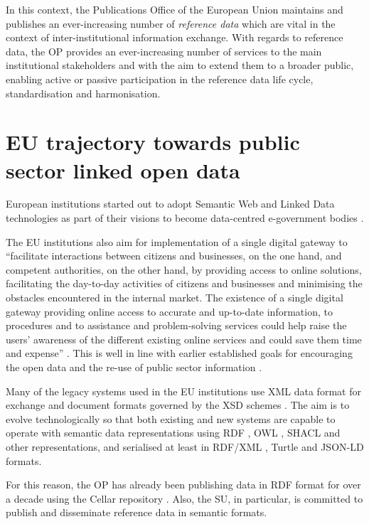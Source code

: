 	In this context, the Publications Office of the European Union maintains and publishes an ever-increasing number of \textit{reference data} which are vital in the context of inter-institutional information exchange. With regards to reference data, the OP provides an ever-increasing number of services to the main institutional stakeholders and with the aim to extend them to a broader public, enabling active or passive participation in the reference data life cycle, standardisation and harmonisation.

	\section{EU trajectory towards public sector linked open data}
	
	European institutions started out to adopt Semantic Web and Linked Data technologies as part of their visions to become data-centred e-government bodies \citep{decission-456/2005/EC,decission-2015/2240}. 
	
	The EU institutions also aim for implementation of a single digital gateway to ``facilitate interactions between citizens and businesses, on the one hand, and competent authorities, on the other hand, by providing access to online solutions, facilitating the day-to-day activities of citizens and businesses and minimising the obstacles encountered in the internal market. The existence of a single digital gateway providing online access to accurate and up-to-date information, to procedures and to assistance and problem-solving services could help raise the users' awareness of the different existing online services and could save them time and expense'' \citep{directive-2018/1724}. This is well in line with earlier established goals for encouraging the open data and the re-use of public sector information \citep{directive-2013/37/EU,directive-2019/1024}.

	Many of the legacy systems used in the EU institutions use XML data format for exchange and document formats governed by the XSD schemes \citep{xsd1.1-spec}. The aim is to evolve technologically so that both existing and new systems are capable to operate with semantic data representations using RDF \citep{rdf11}, OWL \citep{owl2.0,owl2}, SHACL \citep{shacl-spec} and other representations, and serialised at least in RDF/XML \citep{rdf-xml-Beckett:04:RSS,rdf-xml-Schreiber:14:RXS}, Turtle \citep{turtle-Carothers:14:RT} and JSON-LD \citep{spornyjson,sporny2014json} formats.
	
	For this reason, the OP has already been publishing data in RDF format for over a decade using the Cellar repository \citep{cdm-francesconi2015ontology}. Also, the SU, in particular, is committed to publish and disseminate reference data in semantic formats. 
	
